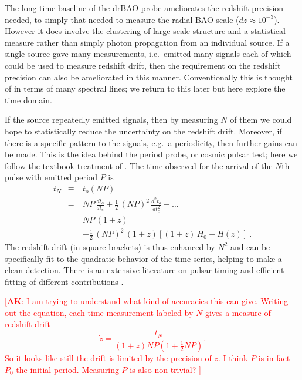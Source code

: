 \documentclass[preprint2, 10pt]{aastex}
\newcommand{\bea}{\begin{eqnarray}}
\newcommand{\eea}{\end{eqnarray}}
\newcommand{\alex}[1]{\textcolor{red}{[{\bf AK}: #1]}}
\begin{document}
The long time baseline of the drBAO probe ameliorates the redshift 
precision needed, to simply that needed to measure the radial BAO scale 
($dz\approx10^{-3}$).  However it does involve the clustering of large scale 
structure and a statistical measure rather than simply photon propagation 
from an individual source.  If a single source gave many measurements, 
i.e.\ emitted many signals each of which could be used to measure redshift 
drift, then the requirement on the redshift precision can also be 
ameliorated in this manner.  
Conventionally this is thought of in terms of many spectral lines; we 
return to this later but here explore the time domain. 

If the source repeatedly emitted signals, then by measuring $N$ of them 
we could hope to statistically reduce the uncertainty on the redshift drift.  
Moreover, if there 
is a specific pattern to the signals, e.g.\ a periodicity, then further 
gains can be made.  This is the idea behind the period probe, or cosmic 
pulsar test; here we follow the textbook treatment of \citet{fpoc}.  The time 
observed for the arrival of the $N$th pulse with emitted period $P$ is 
\bea 
t_N&\equiv& t_o(NP)\nonumber\\ 
&=&NP\,\frac{dt_o}{dt_e}+\frac{1}{2}\,(NP)^2\,\frac{d^2t_o}{dt_e^2}+\dots\\ 
&=&NP\,(1+z)\nonumber\\ 
&\quad&+\frac{1}{2}\,(NP)^2\,(1+z)\left[(1+z)\,H_0-H(z)\right]\ . 
\eea 
The redshift drift (in square brackets) is thus enhanced by $N^2$ and 
can be specifically fit to the quadratic behavior of the time series, 
helping to make a clean detection.  There is an extensive literature on 
pulsar timing and efficient fitting of different contributions 
\citep{pulsars}. 


\alex{I am trying to understand what kind of accuracies this can give.
Writing out the equation, each time measurement labeled by $N$ gives a measure of redshift drift
\begin{equation}
\dot{z}=\frac{t_N}{(1+z)NP(1+\frac{1}{2}NP)}.
\end{equation}
So it looks like still the drift is limited by the precision of $z$.  I think $P$ is in
fact $P_0$ the initial period.  Measuring $P$ is also non-trivial?
}
\end{document}
